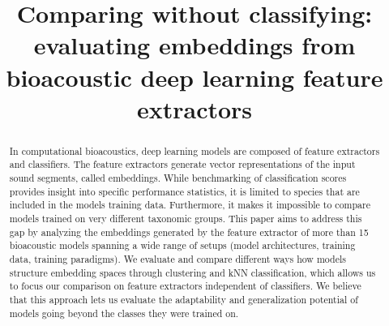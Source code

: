\documentclass[11pt]{article}
\title{Comparing without classifying: evaluating embeddings from bioacoustic deep learning feature extractors}
\begin{document}
%
\maketitle
\begin{abstract}
In computational bioacoustics, deep learning models are composed of feature extractors and classifiers. 
The feature extractors generate vector representations of the input sound segments, called embeddings. 
While benchmarking of classification scores provides insight into specific performance statistics, it is limited to species that are included in the models training data. Furthermore, it makes it impossible to compare models trained on very different taxonomic groups. 
This paper aims to address this gap by analyzing the embeddings generated by the feature extractor of more than 15 bioacoustic models spanning a wide range of setups (model architectures, training data, training paradigms). 
We evaluate and compare different ways how models structure embedding spaces through clustering and kNN classification, which allows us to focus our comparison on feature extractors independent of classifiers. 
We believe that this approach lets us evaluate the adaptability and generalization potential of models going beyond the classes they were trained on.
\end{abstract}
\end{document}
